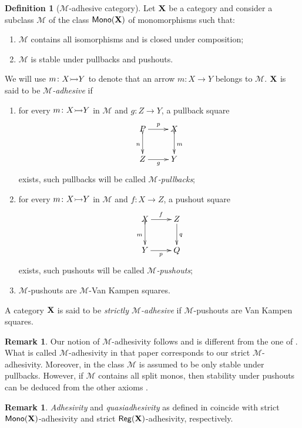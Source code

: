 \documentclass[a4paper]{article}
\newcommand{\mon}{\mathsf{Mono}}
\newcommand{\reg}{\mathsf{Reg}}
\newcommand{\mto}[0]{\scalebox{1}{$\rightarrowtail$}}
\def\X{\textbf {\textup{X}}}
\theoremstyle{definition}
\newtheorem{definition}[theorem]{Definition}
\newtheorem{remark}[theorem]{Remark}
\begin{document}
\begin{definition}[$\mathcal{M}$-adhesive category]
	Let $\X$ be a category and consider a subclass $\mathcal{M}$ of the class $\mon(\X)$ of monomorphisms such that:
	\begin{enumerate}
		\item $\mathcal{M}$ contains all isomorphisms and is closed under composition;
		\item $\mathcal{M}$ is stable under pullbacks and pushouts.
	\end{enumerate} 
	We will use $m\colon X\mto Y$ to denote that an arrow $m\colon X\to Y$ belongs to $\mathcal{M}$. $\X$ is said to be \emph{$\mathcal{M}$-adhesive} if
	\begin{enumerate}
		\item for every $m\colon X\mto Y$ in $\mathcal{M}$ and $g\colon Z\to Y$, a pullback square
		\[\xymatrix{P\ar[r]^p \ar@{>->}[d]_{n}& X \ar@{>->}[d]^{m}\\ Z \ar[r]_g& Y}\]
		exists, such pullbacks will be called \emph{$\mathcal{M}$-pullbacks};
		\item for every $m\colon X\mto Y$ in $\mathcal{M}$ and $f\colon X\to Z$, a pushout square
		\[\xymatrix{X \ar[r]^f \ar@{>->}[d]_{m}& Z \ar[d]^{q}\\ Y\ar[r]_p &Q}\]
		exists, such pushouts  will be called \emph{$\mathcal{M}$-pushouts}; 
		\item  $\mathcal{M}$-pushouts are $\mathcal{M}$-Van Kampen squares.
	\end{enumerate}
	
A category $\X$ is said to be \emph{strictly $\mathcal{M}$-adhesive} if $\mathcal{M}$-pushouts are Van Kampen squares.	
\end{definition}

\begin{remark}\label{rem:diff}Our notion of $\mathcal{M}$-adhesivity follows \cite{ehrig2012,ehrig2014adhesive} and is different from the one of \cite{azzi2019essence}. What is called $\mathcal{M}$-adhesivity in that paper corresponds to our strict $\mathcal{M}$-adhesivity. Moreover, in \cite{azzi2019essence} the class $\mathcal{M}$ is assumed to be only stable under pullbacks. However, if $\mathcal{M}$ contains all split monos, then stability under pushouts can be deduced from the other axioms \cite[Prop.~$5.1.21$]{castelnovo2023thesis}.
\end{remark}


\begin{remark}\label{rem:salva} 
	\emph{Adhesivity} and \emph{quasiadhesivity} as defined in \cite{lack2005adhesive,garner2012axioms}  coincide with  strict $\mon(\X) $-adhesivity and strict $\reg(\X)$-adhesivity, respectively. 
\end{remark}
\end{document}
